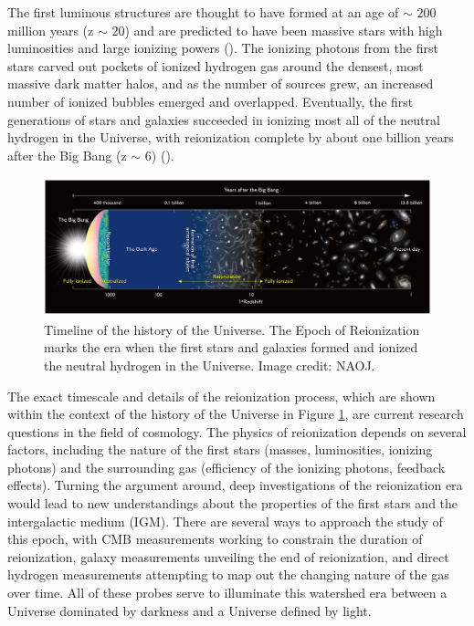 The first luminous structures are thought to have formed at an age of $\sim$ $200$ million years (z $\sim$ 20) and are predicted to have been massive stars with high luminosities and large ionizing powers (\citealt{loeb_furlanetto_2013}). The ionizing photons from the first stars carved out pockets of ionized hydrogen gas around the densest, most massive dark matter halos, and as the number of sources grew, an increased number of ionized bubbles emerged and overlapped. Eventually, the first generations of stars and galaxies succeeded in ionizing most all of the neutral hydrogen in the Universe, with reionization complete by about one billion years after the Big Bang (z $\sim$ 6) (\citealt{furlanetto_et_al2006}). 

\begin{figure}
	\centering
	\includegraphics[width=\columnwidth]{plots/timeline_history.jpg}
	\caption{Timeline of the history of the Universe. The Epoch of Reionization marks the era when the first stars and galaxies formed and ionized the neutral hydrogen in the Universe. Image credit: NAOJ.}
	\label{fig:timeline_history}
\end{figure}

The exact timescale and details of the reionization process, which are shown within the context of the history of the Universe in Figure \ref{fig:timeline_history}, are current research questions in the field of cosmology. The physics of reionization depends on several factors, including the nature of the first stars (masses, luminosities, ionizing photons) and the surrounding gas (efficiency of the ionizing photons, feedback effects). Turning the argument around, deep investigations of the reionization era would lead to new understandings about the properties of the first stars and the intergalactic medium (IGM). There are several ways to approach the study of this epoch, with CMB measurements working to constrain the duration of reionization, galaxy measurements unveiling the end of reionization, and direct hydrogen measurements attempting to map out the changing nature of the gas over time. All of these probes serve to illuminate this watershed era between a Universe dominated by darkness and a Universe defined by light.

